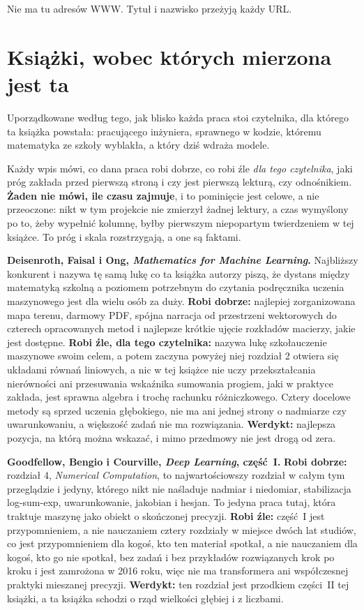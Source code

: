 Nie ma tu adresów WWW. Tytuł i nazwisko przeżyją każdy URL.

\section{Książki, wobec których mierzona jest ta}
\label{sec:E-survey}

Uporządkowane według tego, jak blisko każda praca stoi czytelnika, dla którego
ta książka powstała: pracującego inżyniera, sprawnego w kodzie, któremu
matematyka ze szkoły wyblakła, a który dziś wdraża modele.

Każdy wpis mówi, co dana praca robi dobrze, co robi źle \emph{dla tego
czytelnika}, jaki próg zakłada przed pierwszą stroną i czy jest pierwszą
lekturą, czy odnośnikiem. \textbf{Żaden nie mówi, ile czasu zajmuje}, i to
pominięcie jest celowe, a nie przeoczone: nikt w tym projekcie nie zmierzył
żadnej lektury, a czas wymyślony po to, żeby wypełnić kolumnę, byłby pierwszym
niepopartym twierdzeniem w tej książce. To próg i skala rozstrzygają, a one są
faktami.

\medskip
\textbf{Deisenroth, Faisal i Ong, \emph{Mathematics for Machine Learning}.}
Najbliższy konkurent i nazywa tę samą lukę co ta książka \dash{} autorzy piszą,
że dystans między matematyką szkolną a poziomem potrzebnym do czytania
podręcznika uczenia maszynowego jest dla wielu osób za duży.
\textbf{Robi dobrze:} najlepiej zorganizowana mapa terenu, darmowy PDF, spójna
narracja od przestrzeni wektorowych do czterech opracowanych metod i najlepsze
krótkie ujęcie rozkładów macierzy, jakie jest dostępne.
\textbf{Robi źle, dla tego czytelnika:} nazywa lukę szkoła\dash{}uczenie
maszynowe swoim celem, a potem zaczyna powyżej niej \dash{} rozdział 2 otwiera
się układami równań liniowych, a nic w tej książce nie uczy przekształcania
nierówności ani przesuwania wskaźnika sumowania \dash{} progiem, jaki w
praktyce zakłada, jest sprawna algebra i trochę rachunku różniczkowego.
Cztery docelowe metody są
sprzed uczenia głębokiego, nie ma ani jednej strony o nadmiarze czy
uwarunkowaniu, a większość zadań nie ma rozwiązania.
\textbf{Werdykt:} najlepsza pozycja, na którą można wskazać, i mimo przedmowy
nie jest drogą od zera.

\medskip
\textbf{Goodfellow, Bengio i Courville, \emph{Deep Learning}, część~I.}
\textbf{Robi dobrze:} rozdział 4, \emph{Numerical Computation}, to
najwartościowszy rozdział w całym tym przeglądzie i jedyny, którego
nikt nie naśladuje \dash{} nadmiar i niedomiar, stabilizacja log-sum-exp,
uwarunkowanie, jakobian i hesjan. To jedyna praca tutaj, która traktuje maszynę
jako obiekt o skończonej precyzji. \textbf{Robi źle:} część~I jest
przypomnieniem, a nie nauczaniem \dash{} cztery rozdziały w miejsce dwóch lat
studiów, co jest przypomnieniem dla kogoś, kto ten materiał spotkał, a nie
nauczaniem dla kogoś, kto go nie spotkał, bez zadań i bez przykładów
rozwiązanych krok po kroku \dash{} i jest
zamrożona w 2016 roku, więc nie ma transformera ani współczesnej praktyki
mieszanej precyzji. \textbf{Werdykt:} ten rozdział jest przodkiem części~II tej
książki, a ta książka schodzi o rząd wielkości głębiej i z liczbami.

